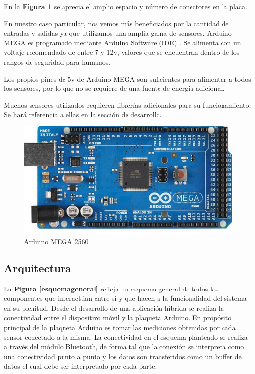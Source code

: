\documentclass{IEEEtran}
\begin{document}
			En la \textbf{Figura \ref{arduino-mega}} se aprecia el amplio espacio y número de conectores en la placa.

			En nuestro caso particular, nos vemos más beneficiados por la cantidad de entradas y salidas ya que utilizamos una amplia gama de sensores. Arduino MEGA es programado mediante Arduino Software (IDE) \cite{refarduinoide}.  Se alimenta con un voltaje recomendado de entre 7 y 12v, valores que se encuentran dentro de los rangos de seguridad para humanos.

			Los propios pines de 5v de Arduino MEGA son suficientes para alimentar a todos los sensores, por lo que no se requiere de una fuente de energía adicional.

			Muchos sensores utilizados requieren librerías adicionales para su funcionamiento. Se hará referencia a ellas en la sección de desarrollo.
			
			\begin{figure}[h]
				\centering
				\includegraphics[width=1\linewidth]{arduino-mega}
				\caption{Arduino MEGA 2560}
				\label{arduino-mega}
			\end{figure}
	
		\subsection{Arquitectura}

			La \textbf{Figura \ref{esquemageneral}} refleja un esquema general de todos los componentes que interactúan entre sí y que hacen a la funcionalidad del sistema en su plenitud. Desde el desarrollo de una aplicación híbrida se realiza la conectividad entre el dispositivo móvil y la plaqueta Arduino. En propósito principal de la plaqueta Arduino es tomar las mediciones obtenidas por cada sensor conectado a la misma. La conectividad en el esquema planteado se realiza a través del módulo Bluetooth, de forma tal que la conexión se interpreta como una conectividad punto a punto y los datos son transferidos como un buffer de datos el cual debe ser interpretado por cada parte.
\end{document}
